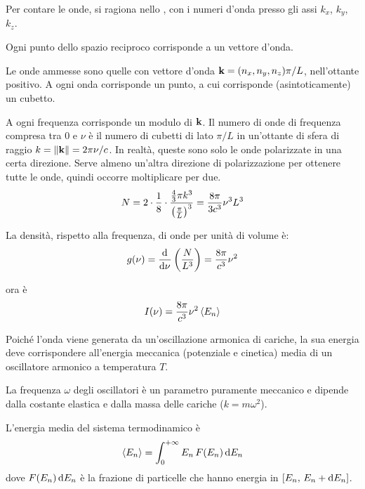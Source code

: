 Per contare le onde, si ragiona nello , con i numeri d'onda presso gli assi $k_x$, $k_y$, $k_z$.

Ogni punto dello spazio reciproco corrisponde a un vettore d'onda.

Le onde ammesse sono quelle con vettore d'onda $\mathbf{k} = (n_x, n_y, n_z) \pi/L$, nell'ottante positivo. A ogni onda corrisponde un punto, a cui corrisponde (asintoticamente) un cubetto.

A ogni frequenza corrisponde un modulo di $\mathbf{k}$.
Il numero di onde di frequenza compresa tra $0$ e $\nu$ è il numero di cubetti di lato $\pi / L$ in un'ottante di sfera di raggio $k = \left\lVert \mathbf{k} \right\rVert = 2\pi \nu / c$.
In realtà, queste sono solo le onde polarizzate in una certa direzione.
Serve almeno un'altra direzione di polarizzazione per ottenere tutte le onde, quindi occorre moltiplicare per due.
\begin{equation}
    N = 2 \cdot \frac{1}{8} \cdot \frac{\frac{4}{3} \pi k^3}{\left( \frac{\pi}{L} \right)^3}
    = \frac{8 \pi}{3 c^3} \nu^3 L^3
\end{equation}

La densità, rispetto alla frequenza, di onde per unità di volume è:
\begin{equation}
    g(\nu) = \der{\nu} \pts{\frac{N}{L^3}}
    = \frac{8 \pi}{c^3} \nu^2
\end{equation}

 ora è
\begin{equation}
    I(\nu) = \frac{8 \pi}{c^3} \nu^2 \left\langle {E_n} \right\rangle
\end{equation}

Poiché l'onda viene generata da un'oscillazione armonica di cariche, la sua energia deve corrispondere all'energia meccanica (potenziale e cinetica) media di un oscillatore armonico a temperatura $T$.

La frequenza $\omega$ degli oscillatori è un parametro puramente meccanico e dipende dalla costante elastica e dalla massa delle cariche ($k = m \omega^2$).

L'energia media del sistema termodinamico è
\begin{equation}
\label{eq:energia_media}
    \left\langle {E_n} \right\rangle = \int_0^{+\infty} {E_n} \, F({E_n}) \, \mathrm{d} {E_n}
\end{equation}
dove $F({E_n}) \, \mathrm{d} {E_n}$ è la frazione di particelle che hanno energia in $[{E_n}, \, {E_n} + \mathrm{d} {E_n}]$.


